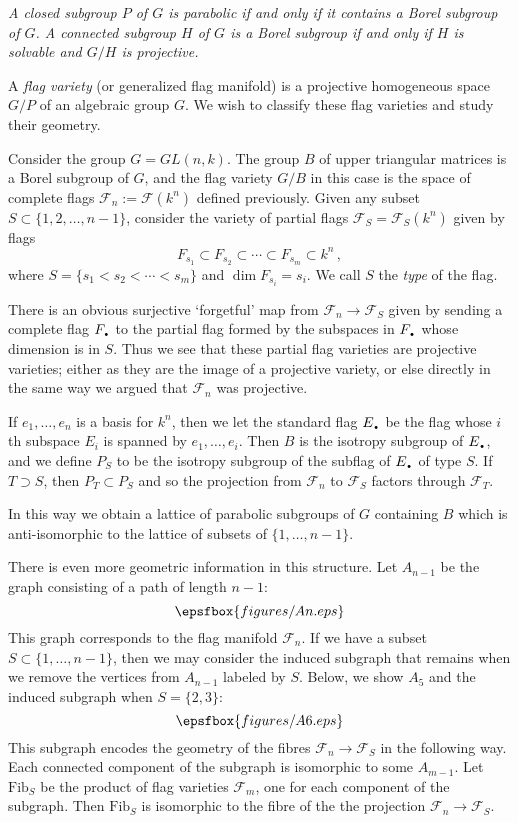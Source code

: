 \documentclass[12pt]{amsart}
\newcommand{\DOT}{{\mbox{\Large\bf .}}}
\begin{document}
{\it
A closed subgroup $P$ of $G$ is parabolic if and only if it contains a Borel
subgroup of $G$.
A connected subgroup $H$ of $G$ is a Borel subgroup if and only if $H$ is
solvable and $G/H$ is projective.}\medskip


A {\sl flag variety} (or generalized flag manifold) is a projective
homogeneous space $G/P$ of an algebraic group $G$.
We wish to classify these flag varieties and study their geometry.
\medskip

Consider the group $G=GL(n,k)$.
The group $B$ of upper triangular matrices is a Borel subgroup of $G$, and
the flag variety $G/B$ in this case is the space of complete flags
${\mathcal F}_n:={\mathcal F}(k^n)$ defined previously.
Given any subset $S\subset \{1,2,\ldots,n-1\}$, consider the variety of
partial flags ${\mathcal F}_S={\mathcal F}_S(k^n)$ given by flags
$$
   F_{s_1}\subset F_{s_2}\subset \cdots \subset F_{s_m}\subset k^n\,,
$$
where $S=\{s_1<s_2<\cdots<s_m\}$ and $\dim F_{s_i}=s_i$.
We call $S$ the {\sl type} of the flag.

There is an obvious surjective `forgetful' map from 
${\mathcal F}_n\to {\mathcal F}_S$ given by sending a complete flag
$F_{\DOT}$ to the partial flag formed by the subspaces in $F_{\DOT}$ whose
dimension is in $S$.
Thus we see that these partial flag varieties are projective varieties;
either as they are the image of a projective variety, or else directly in
the same way we argued that ${\mathcal F}_n$ was projective.

If $e_1,\ldots, e_n$ is a basis for $k^n$, then we let the standard flag
$E_{\DOT}$ be the flag whose $i$th subspace $E_i$ is spanned by
$e_1,\ldots, e_i$.
Then $B$ is the isotropy subgroup of $E_{\DOT}$, and we define $P_S$ to be
the isotropy subgroup of the subflag of $E_{\DOT}$ of type $S$.
If $T\supset S$, then $P_T\subset P_S$ and so the projection from 
${\mathcal F}_n$ to ${\mathcal F}_S$ factors through ${\mathcal F}_T$. 

In this way we obtain a lattice of parabolic subgroups of $G$ containing $B$ 
which is anti-isomorphic to the lattice of subsets of $\{1,\ldots,n-1\}$.

There is even more geometric information in this structure.
Let $A_{n-1}$ be the graph consisting of a path of length $n-1$:
$$
  \epsfbox{figures/An.eps}
$$
This graph corresponds to the flag manifold ${\mathcal F}_n$.
If we have a subset $S\subset \{1,\ldots,n-1\}$, then we may consider the 
induced subgraph that remains when we remove the vertices from $A_{n-1}$
labeled by $S$. 
Below, we show $A_5$ and the induced subgraph when $S=\{2,3\}$:
$$
  \epsfbox{figures/A6.eps}
$$
This subgraph encodes the geometry of the fibres 
${\mathcal F}_n\to{\mathcal F}_S$ in the following way.
Each connected component of the subgraph is isomorphic to some $A_{m-1}$.
Let $\mbox{Fib}_S$ be the product of flag varieties ${\mathcal F}_m$, one
for each component of the subgraph.
Then $\mbox{Fib}_S$ is isomorphic to the fibre of the the projection
${\mathcal F}_n\to{\mathcal F}_S$.
\end{document}
